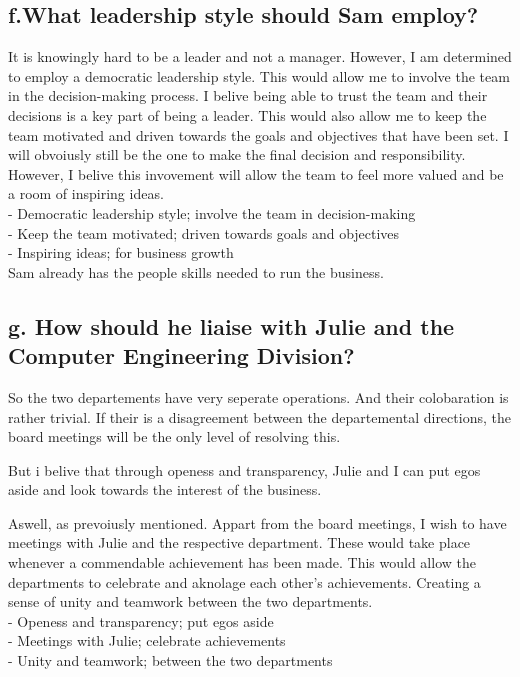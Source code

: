 \documentclass{article}
\begin{document}
\subsection{f.What leadership style should Sam employ?}
It is knowingly hard to be a leader and not a manager. However, I am determined to employ a democratic leadership style. This would allow me to involve the team in the decision-making process. I belive being able to trust the team and their decisions is a key part of being a leader. This would also allow me to keep the team motivated and driven towards the goals and objectives that have been set. I will obvoiusly still be the one to make the final decision and responsibility. However, I belive this invovement will allow the team to feel more valued and be a room of inspiring ideas. \\
- Democratic leadership style; involve the team in decision-making \\
- Keep the team motivated; driven towards goals and objectives \\
- Inspiring ideas; for business growth \\

Sam already has the people skills needed to run the business.

\subsection{g. How should he liaise with Julie and the Computer Engineering Division?}
So the two departements have very seperate operations. And their colobaration is rather trivial. If their is a disagreement between the departemental directions, the board meetings will be the only level of resolving this.

But i belive that through openess and transparency, Julie and I can put egos aside and look towards the interest of the business.

Aswell, as prevoiusly mentioned. Appart from the board meetings, I wish to have meetings with Julie and the respective department. These would take place whenever a commendable achievement has been made. This would allow the departments to celebrate and aknolage each other's achievements. Creating a sense of unity and teamwork between the two departments. \\

- Openess and transparency; put egos aside \\
- Meetings with Julie; celebrate achievements \\
- Unity and teamwork; between the two departments \\
\end{document}
